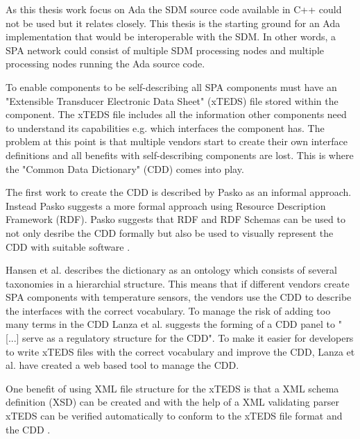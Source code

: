 
As this thesis work focus on Ada the SDM source code available in C++ could not
be used but it relates closely. This thesis is the starting ground for an Ada
implementation that would be interoperable with the SDM. In other words, a SPA
network could consist of multiple SDM processing nodes and multiple processing
nodes running the Ada source code.

To enable components to be self-describing all SPA components must have an
"Extensible Transducer Electronic Data Sheet" (xTEDS) file stored within the
component. The xTEDS file includes all the information other components need to
understand its capabilities e.g. which interfaces the component has. The
problem at this point is that multiple vendors start to create their own
interface definitions and all benefits with self-describing components are
lost. This is where the "Common Data Dictionary" (CDD) comes into play.


The first work to create the CDD is described by Pasko as an informal
approach.  Instead Pasko suggests a more formal approach using Resource
Description Framework (RDF). Pasko
suggests that RDF and RDF Schemas can be used to not only desribe the CDD
formally but also be used to visually represent the CDD with suitable software
\cite{pasko2011}.

Hansen et al. \cite{hansen2012} describes the dictionary as an ontology which
consists of several taxonomies in a hierarchial structure. This means that if
different vendors create SPA components with temperature sensors, the vendors
use the CDD to describe the interfaces with the correct vocabulary. To manage
the risk of adding too many terms in the CDD Lanza et al. \cite{lanza2010}
suggests the forming of a CDD panel to "[...] serve as a regulatory structure
for the CDD". To make it easier for developers to write xTEDS files with the
correct vocabulary and improve the CDD, Lanza et al.  \cite{lanza2010} have
created a web based tool to manage the CDD.

One benefit of using XML file structure for the xTEDS is that a XML schema
definition (XSD) can be created and with the help of a XML validating parser
xTEDS can be verified automatically to conform to the xTEDS file format and the
CDD \cite{lanza2010}.

